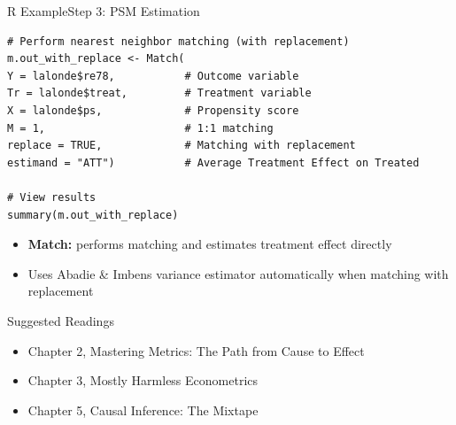 \documentclass[hyperref={pdfpagelabels=false}]{beamer}
\begin{document}
\begin{frame}[fragile]{R Example}{Step 3: PSM Estimation}
\begin{lstlisting}
# Perform nearest neighbor matching (with replacement)
m.out_with_replace <- Match(
Y = lalonde$re78,           # Outcome variable
Tr = lalonde$treat,         # Treatment variable
X = lalonde$ps,             # Propensity score
M = 1,                      # 1:1 matching
replace = TRUE,             # Matching with replacement
estimand = "ATT")           # Average Treatment Effect on Treated

# View results
summary(m.out_with_replace)
\end{lstlisting}
	\begin{itemize}
		\vspace{0.2cm}
		\item \textbf{Match:} performs matching and estimates treatment effect directly
		\vspace{0.2cm}
		\item Uses Abadie \& Imbens variance estimator automatically when matching with replacement
	\end{itemize}
\end{frame}




\begin{frame}{Suggested Readings}
	\begin{itemize} 
		\item Chapter 2, Mastering Metrics: The Path from Cause to Effect
		\vspace{0.2cm}
		\item Chapter 3, Mostly Harmless Econometrics
		\vspace{0.2cm}
		\item Chapter 5, Causal Inference: The Mixtape
	\end{itemize}
\end{frame}
\end{document}

